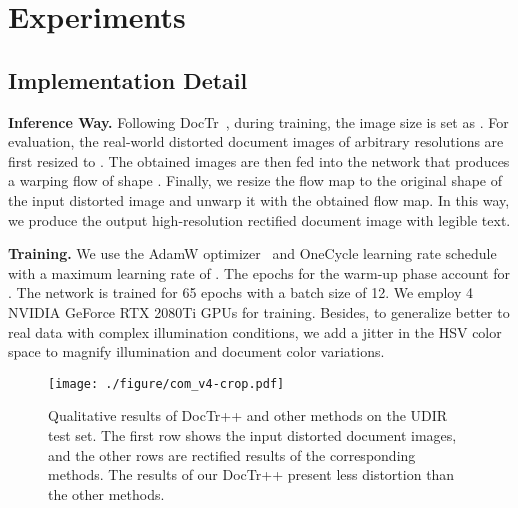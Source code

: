 \documentclass[lettersize,journal]{IEEEtran}
\begin{document}
\section{Experiments}
 
\subsection{Implementation Detail}
\textbf{Inference Way.}
Following DocTr~\cite{feng2021doctr}, during training, the image size  is set as .
For evaluation, the real-world distorted document images of arbitrary resolutions are first resized to . The obtained images are then fed into the network that produces a warping flow of shape . Finally, we resize the flow map to the original shape of the input distorted image and unwarp it with the obtained flow map. In this way, we produce the output high-resolution rectified document image with legible text.


\smallskip
\textbf{Training.}
We use the AdamW optimizer~\cite{loshchilov2017decoupled} and OneCycle learning rate schedule~\cite{smith2019super} with a maximum learning rate of .
The epochs for the warm-up phase account for .
The network is trained for 65 epochs with a batch size of 12.
We employ 4 NVIDIA GeForce RTX 2080Ti GPUs for training.
Besides, to generalize better to real data with complex illumination conditions, we add a jitter in the HSV color space to magnify illumination and document color variations. 

\begin{figure*}[t]
  \centering
  \texttt{[image: ./figure/com\_v4-crop.pdf]}
  \caption{Qualitative results of DocTr++ and other methods on the UDIR test set. The first row shows the input distorted document images, and the other rows are rectified results of the corresponding methods. The results of our DocTr++ present less distortion than the other methods.}
  \label{fig:qua_eva_udoc}
  \vspace{0.05in}
\end{figure*}
\end{document}
